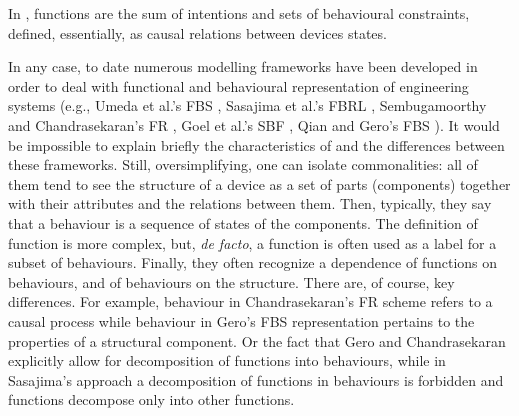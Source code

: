 \documentclass[sw]{iosart2x}
\newcommand{\TODO}[1]{{\color{red} #1
}}
\newcommand{\myComment}[1]{{\unskip \ignorespaces}}
\begin{document}
In \cite{chandrasekaranFunctionDeviceRepresentation2000}, functions are the sum of intentions and sets of behavioural constraints, defined, essentially, as causal relations between devices states.


In any case, to date numerous modelling frameworks have been developed in order to deal with functional and behavioural representation of engineering systems (e.g., Umeda et al.'s FBS \cite{umedaFunctionBehaviourStructure1990}, Sasajima et al.'s FBRL \cite{sasajimaFBRLFunctionBehavior1995}, Sembugamoorthy and Chandrasekaran's FR \cite{sembugamoorthy1986functional}, Goel et al.'s SBF \cite{goelUseDesignPatterns2004}, Qian and Gero's FBS \cite{qianFunctionBehaviorStructure1996}).
It would be impossible to explain briefly the characteristics of and the differences between these frameworks. Still, oversimplifying, one can isolate commonalities: all of them tend to see the structure of a device as a set of parts (components) together with their attributes and the relations between them. Then, typically, they say that a behaviour is a sequence of states of the components. The definition of function is more \myComment{murky} complex, but, \textit{de facto}, a function is often used as a label for a subset of behaviours. Finally, they often recognize a dependence of functions on behaviours, and of behaviours on the structure. 
There are, of course, key differences. 
For example, behaviour in Chandrasekaran’s FR scheme refers to a causal process while behaviour in Gero’s FBS representation pertains to the properties of a structural component.
Or the fact that Gero and Chandrasekaran explicitly allow for decomposition of functions into behaviours, while in Sasajima's approach a decomposition of functions in behaviours is forbidden and functions decompose only into other functions.  
\end{document}
